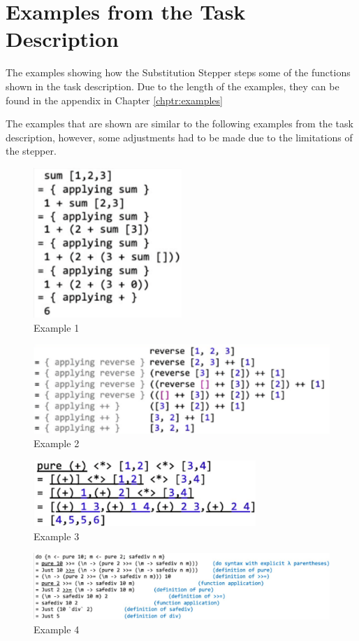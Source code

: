 \chapter{Examples from the Task Description}

The examples showing how the Substitution Stepper steps some of the functions shown in the task description.
Due to the length of the examples,
they can be found in the appendix in Chapter \ref*{chptr:examples}

The examples that are shown are similar to the following examples from the task description,
however, some adjustments had to be made due to the limitations of the stepper.

\begin{figure}
    \includegraphics[width=0.5\textwidth]{resources/example1.PNG}
    \caption{Example 1}
\end{figure}
\begin{figure}
    \includegraphics[width=1.0\textwidth]{resources/example2.PNG}
    \caption{Example 2}
\end{figure}
\begin{figure}
    \includegraphics[width=0.75\textwidth]{resources/example3.PNG}
    \caption{Example 3}
\end{figure}
\begin{figure}
    \includegraphics[width=1\textwidth]{resources/example4.PNG}
    \caption{Example 4}
\end{figure}
